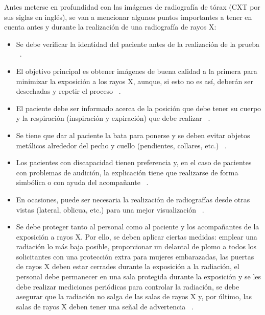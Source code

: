 Antes meterse en profundidad con las imágenes de radiografía de tórax (CXT por sus siglas en inglés), se van a mencionar algunos puntos importantes a tener en cuenta antes y durante la realización de una radiografía de rayos X:
\begin{itemize}
    \item Se debe verificar la identidad del paciente antes de la realización de la prueba ~\cite{gelaw15}.
    \item El objetivo principal es obtener imágenes de buena calidad a la primera para minimizar la exposición a los rayos X, aunque, si esto no es así, deberán ser desechadas y repetir el proceso ~\cite{gelaw15}.
    \item El paciente debe ser informado acerca de la posición que debe tener su cuerpo y la respiración (inspiración y expiración) que debe realizar ~\cite{gelaw15}.
    \item Se tiene que dar al paciente la bata para ponerse y se deben evitar objetos metálicos alrededor del pecho y cuello (pendientes, collares, etc.) ~\cite{gelaw15}.
    \item Los pacientes con discapacidad tienen preferencia y, en el caso de pacientes con problemas de audición, la explicación tiene que realizarse de forma simbólica o con ayuda del acompañante ~\cite{gelaw15}.
    \item En ocasiones, puede ser necesaria la realización de radiografías desde otras vistas (lateral, oblicua, etc.) para una mejor visualización ~\cite{gelaw15}.
    \item Se debe proteger tanto al personal como al paciente y los acompañantes de la exposición a rayos X. Por ello, se deben aplicar ciertas medidas: emplear una radiación lo más baja posible, proporcionar un delantal de plomo a todos los solicitantes con una protección extra para mujeres embarazadas, las puertas de rayos X deben estar cerrades durante la exposición a la radiación, el personal debe permanecer en una sala protegida durante la exposición y se les debe realizar mediciones periódicas para controlar la radiación, se debe asegurar que la radiación no salga de las salas de rayos X y, por último, las salas de rayos X deben tener una señal de advertencia ~\cite{gelaw15}. 
    
\end{itemize}

